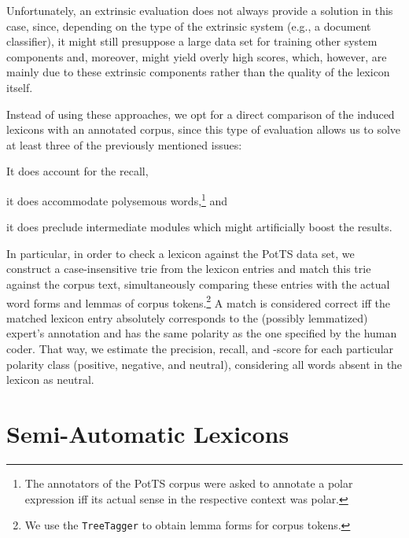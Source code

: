 Unfortunately, an extrinsic evaluation does not always provide a
solution in this case, since, depending on the type of the extrinsic
system (e.g., a document classifier), it might still presuppose a
large data set for training other system components and, moreover,
might yield overly high scores, which, however, are mainly due to
these extrinsic components rather than the quality of the lexicon
itself.

Instead of using these approaches, we opt for a direct comparison of
the induced lexicons with an annotated corpus, since this type of
evaluation allows us to solve at least three of the previously
mentioned issues:
\begin{inparaenum}[(i)]
  \item It does account for the recall,
  \item it does accommodate polysemous words,\footnote{The annotators
      of the PotTS corpus were asked to annotate a polar expression
      iff its actual sense in the respective context was polar.} and
  \item it does preclude intermediate modules which might artificially
    boost the results.
\end{inparaenum}

In particular, in order to check a lexicon against the PotTS data set,
we construct a case-insensitive trie \cite[pp. 492--512]{Knuth:98}
from the lexicon entries and match this trie against the corpus text,
simultaneously comparing these entries with the actual word forms and
lemmas of corpus tokens.\footnote{We use the \texttt{TreeTagger}
  \cite{Schmid:95} to obtain lemma forms for corpus tokens.} A match
is considered correct iff the matched lexicon entry absolutely
corresponds to the (possibly lemmatized) expert's annotation and has
the same polarity as the one specified by the human coder.  That way,
we estimate the precision, recall, and \F{}-score for each particular
polarity class (positive, negative, and neutral), considering all
words absent in the lexicon as neutral.

\section{Semi-Automatic Lexicons}

